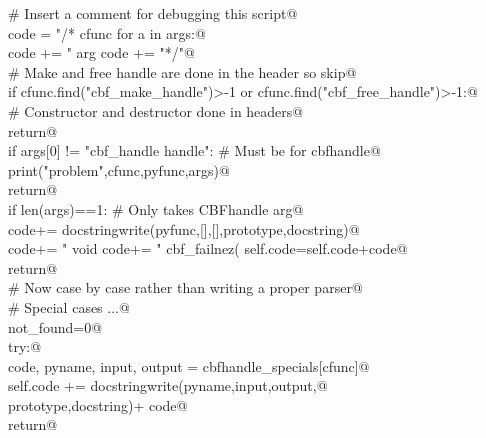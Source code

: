 \documentclass[10pt,a4paper,twoside,notitlepage]{article}
\begin{document}
\begin{flushleft}
\begin{list}{}{}
\mbox{}\verb@       # Insert a comment for debugging this script@\\
\mbox{}\verb@       code = "\n/* cfunc %s   pyfunc %s  \n"%(cfunc,pyfunc)@\\
\mbox{}\verb@       for a in args:@\\
\mbox{}\verb@          code += "   arg %s "%(a)@\\
\mbox{}\verb@       code += "*/\n\n"@\\
\mbox{}\verb@       # Make and free handle are done in the header so skip@\\
\mbox{}\verb@       if cfunc.find("cbf_make_handle")>-1 or cfunc.find("cbf_free_handle")>-1:@\\
\mbox{}\verb@          # Constructor and destructor done in headers@\\
\mbox{}\verb@          return@\\
\mbox{}\verb@       if args[0] != "cbf_handle handle": # Must be for cbfhandle@\\
\mbox{}\verb@          print("problem",cfunc,pyfunc,args)@\\
\mbox{}\verb@          return@\\
\mbox{}\verb@       if len(args)==1: # Only takes CBFhandle arg@\\
\mbox{}\verb@          code+= docstringwrite(pyfunc,[],[],prototype,docstring)@\\
\mbox{}\verb@          code+= "    void %s(void){\n"%(pyfunc)@\\
\mbox{}\verb@          code+= "      cbf_failnez(%s(self));}\n"%(cfunc) @\\
\mbox{}\verb@          self.code=self.code+code@\\
\mbox{}\verb@          return@\\
\mbox{}\verb@       # Now case by case rather than writing a proper parser@\\
\mbox{}\verb@       # Special cases ...@\\
\mbox{}\verb@       not_found=0@\\
\mbox{}\verb@       try:@\\
\mbox{}\verb@           code, pyname, input, output = cbfhandle_specials[cfunc]@\\
\mbox{}\verb@           self.code +=  docstringwrite(pyname,input,output,@\\
\mbox{}\verb@                                              prototype,docstring)+ code@\\
\mbox{}\verb@           return@\\

\end{list}
\end{flushleft}
\end{document}

